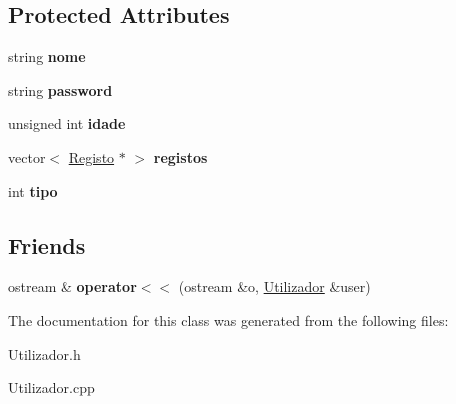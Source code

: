 \subsection*{Protected Attributes}
\begin{DoxyCompactItemize}
\item 
\hypertarget{class_utilizador_a3d22333263aef7b7a61a96b46ba7828d}{string {\bfseries nome}}\label{class_utilizador_a3d22333263aef7b7a61a96b46ba7828d}

\item 
\hypertarget{class_utilizador_aae4c416534c9b645e933cea05db50050}{string {\bfseries password}}\label{class_utilizador_aae4c416534c9b645e933cea05db50050}

\item 
\hypertarget{class_utilizador_aa4c6a81b2b5bb75690e9fb3c8d8412b6}{unsigned int {\bfseries idade}}\label{class_utilizador_aa4c6a81b2b5bb75690e9fb3c8d8412b6}

\item 
\hypertarget{class_utilizador_a2b89c422324741fe6e6aae6e90b8c792}{vector$<$ \hyperlink{class_registo}{Registo} $\ast$ $>$ {\bfseries registos}}\label{class_utilizador_a2b89c422324741fe6e6aae6e90b8c792}

\item 
\hypertarget{class_utilizador_a38d3b0129c3a6d7b68f59429b7003055}{int {\bfseries tipo}}\label{class_utilizador_a38d3b0129c3a6d7b68f59429b7003055}

\end{DoxyCompactItemize}
\subsection*{Friends}
\begin{DoxyCompactItemize}
\item 
\hypertarget{class_utilizador_adc23de1728e267f4b2dc5aed8a410e9e}{ostream \& {\bfseries operator$<$$<$} (ostream \&o, \hyperlink{class_utilizador}{Utilizador} \&user)}\label{class_utilizador_adc23de1728e267f4b2dc5aed8a410e9e}

\end{DoxyCompactItemize}


The documentation for this class was generated from the following files\+:\begin{DoxyCompactItemize}
\item 
Utilizador.\+h\item 
Utilizador.\+cpp\end{DoxyCompactItemize}
